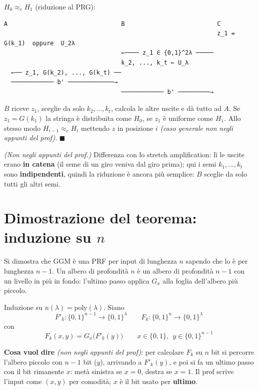 \textbf{\(H_0 \approx_c H_1\)} (riduzione al PRG):

\begin{verbatim}
A                                B                          C
                                                            z_1 = G(k_1)  oppure  U_2λ
                                 ←──── z_1 ∈ {0,1}^2λ ─────
                                 k_2, ..., k_t ← U_λ
  ←── z_1, G(k_2), ..., G(k_t) ──
  ──────────── b' ─────────────→
                                 ──────────── b' ─────────→
\end{verbatim}

\(B\) riceve \(z_1\), sceglie da solo \(k_2, \dots, k_t\), calcola le altre uscite e dà tutto ad \(A\). Se \(z_1 = G(k_1)\) la stringa è distribuita come \(H_0\), se \(z_1\) è uniforme come \(H_1\). Allo stesso modo \(H_{i-1} \approx_c H_i\) mettendo \(z\) in posizione \(i\) \emph{(caso generale non negli appunti del prof)}. \(\blacksquare\)

\begin{nota}
\emph{(Non negli appunti del prof.)} Differenza con lo stretch amplification: lì le uscite erano \textbf{in catena} (il seme di un giro veniva dal giro prima); qui i semi \(k_1, \dots, k_t\) sono \textbf{indipendenti}, quindi la riduzione è ancora più semplice: \(B\) sceglie da solo tutti gli altri semi.
\end{nota}

\section{Dimostrazione del teorema: induzione su \texorpdfstring{\(n\)}{n}}

\begin{inbreve}
Si dimostra che GGM è una PRF per input di lunghezza \(n\) sapendo che lo è per lunghezza \(n-1\). Un albero di profondità \(n\) è un albero di profondità \(n-1\) con un livello in più in fondo: l'ultimo passo applica \(G_x\) alla foglia dell'albero più piccolo.
\end{inbreve}

Induzione su \(n(\lambda) = \text{poly}(\lambda)\). Siano
\[
F'_k : \{0,1\}^{n-1} \to \{0,1\}^\lambda \qquad F_k : \{0,1\}^n \to \{0,1\}^\lambda
\]
con
\[
F_k(x, y) = G_x\big(F'_k(y)\big) \qquad x \in \{0,1\},\ \ y \in \{0,1\}^{n-1}
\]

\begin{nota}
\textbf{Cosa vuol dire} \emph{(non negli appunti del prof)}: per calcolare \(F_k\) su \(n\) bit si percorre l'albero piccolo con \(n-1\) bit (\(y\)), arrivando a \(F'_k(y)\), e poi si fa un ultimo passo con il bit rimanente \(x\): metà sinistra se \(x = 0\), destra se \(x = 1\). Il prof scrive l'input come \((x, y)\) per comodità; \(x\) è il bit usato per \textbf{ultimo}.
\end{nota}

